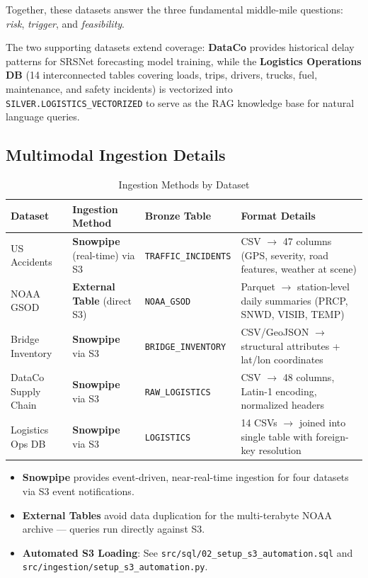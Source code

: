 \documentclass[14.5pt,letterpaper]{article}
\begin{document}
Together, these datasets answer the three fundamental middle-mile questions: \textit{risk}, \textit{trigger}, and \textit{feasibility}.

The two supporting datasets extend coverage: \textbf{DataCo} provides historical delay patterns for SRSNet forecasting model training, while the \textbf{Logistics Operations DB} (14 interconnected tables covering loads, trips, drivers, trucks, fuel, maintenance, and safety incidents) is vectorized into \texttt{SILVER.LOGISTICS\_VECTORIZED} to serve as the RAG knowledge base for natural language queries.

\subsection{Multimodal Ingestion Details}

\begin{table}[H]
\centering
\caption{Ingestion Methods by Dataset}
\small
\begin{tabularx}{\textwidth}{@{}l l l X@{}}
\toprule
\textbf{Dataset} & \textbf{Ingestion Method} & \textbf{Bronze Table} & \textbf{Format Details} \\
\midrule
US Accidents & \textbf{Snowpipe} (real-time) via S3 & \texttt{TRAFFIC\_INCIDENTS} & CSV $\rightarrow$ 47 columns (GPS, severity, road features, weather at scene) \\
NOAA GSOD & \textbf{External Table} (direct S3) & \texttt{NOAA\_GSOD} & Parquet $\rightarrow$ station-level daily summaries (PRCP, SNWD, VISIB, TEMP) \\
Bridge Inventory & \textbf{Snowpipe} via S3 & \texttt{BRIDGE\_INVENTORY} & CSV/GeoJSON $\rightarrow$ structural attributes + lat/lon coordinates \\
DataCo Supply Chain & \textbf{Snowpipe} via S3 & \texttt{RAW\_LOGISTICS} & CSV $\rightarrow$ 48 columns, Latin-1 encoding, normalized headers \\
Logistics Ops DB & \textbf{Snowpipe} via S3 & \texttt{LOGISTICS} & 14 CSVs $\rightarrow$ joined into single table with foreign-key resolution \\
\bottomrule
\end{tabularx}
\end{table}

\begin{itemize}
    \item \textbf{Snowpipe} provides event-driven, near-real-time ingestion for four datasets via S3 event notifications.
    \item \textbf{External Tables} avoid data duplication for the multi-terabyte NOAA archive --- queries run directly against S3.
    \item \textbf{Automated S3 Loading}: See \texttt{src/sql/02\_setup\_s3\_automation.sql} and \texttt{src/ingestion/setup\_s3\_automation.py}.
\end{itemize}
\end{document}
